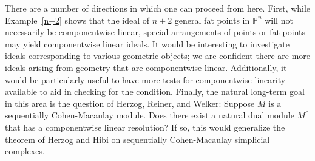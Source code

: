 \documentclass{article}
\begin{document}
There are a number of directions in which one can proceed from here. First, while Example~\ref{n+2} shows that the ideal of $n+2$ general fat points in $\mathbb P^n$ will not necessarily be componentwise linear, special arrangements of points or fat points may yield componentwise linear ideals. It would be interesting to investigate ideals corresponding to various geometric objects; we are confident there are more ideals arising from geometry that are componentwise linear. Additionally, it would be particularly useful to have more tests for componentwise linearity available to aid in checking for the condition. Finally, the natural long-term goal in this area is the question of Herzog, Reiner, and Welker: Suppose $M$ is a sequentially Cohen-Macaulay module. Does there exist a natural dual module $M^*$ that has a componentwise linear resolution? If so, this would generalize the theorem of Herzog and Hibi on sequentially Cohen-Macaulay simplicial complexes.
\end{document}
